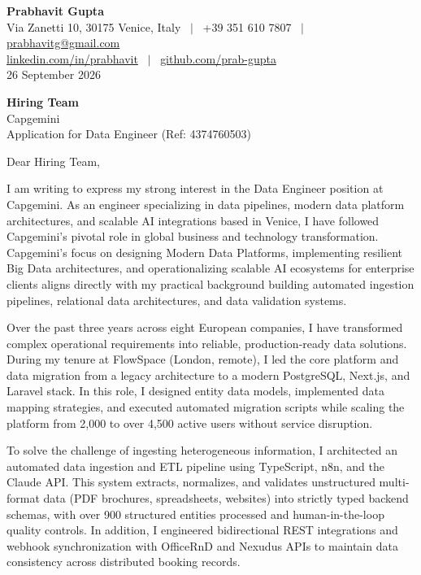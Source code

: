 \documentclass[11pt,a4paper]{article}
\begin{document}
\textbf{\large Prabhavit Gupta}\\
Via Zanetti 10, 30175 Venice, Italy ~$\vert$~ +39 351 610 7807 ~$\vert$~ \href{mailto:prabhavitg@gmail.com}{prabhavitg@gmail.com}\\
\href{https://www.linkedin.com/in/prabhavit/}{linkedin.com/in/prabhavit} ~$\vert$~ \href{https://github.com/prab-gupta}{github.com/prab-gupta}\\
26 September 2026

\textbf{Hiring Team}\\
Capgemini\\
Application for Data Engineer (Ref: 4374760503)

Dear Hiring Team,

I am writing to express my strong interest in the Data Engineer position at Capgemini. As an engineer specializing in data pipelines, modern data platform architectures, and scalable AI integrations based in Venice, I have followed Capgemini's pivotal role in global business and technology transformation. Capgemini's focus on designing Modern Data Platforms, implementing resilient Big Data architectures, and operationalizing scalable AI ecosystems for enterprise clients aligns directly with my practical background building automated ingestion pipelines, relational data architectures, and data validation systems.

Over the past three years across eight European companies, I have transformed complex operational requirements into reliable, production-ready data solutions. During my tenure at FlowSpace (London, remote), I led the core platform and data migration from a legacy architecture to a modern PostgreSQL, Next.js, and Laravel stack. In this role, I designed entity data models, implemented data mapping strategies, and executed automated migration scripts while scaling the platform from 2,000 to over 4,500 active users without service disruption.

To solve the challenge of ingesting heterogeneous information, I architected an automated data ingestion and ETL pipeline using TypeScript, n8n, and the Claude API. This system extracts, normalizes, and validates unstructured multi-format data (PDF brochures, spreadsheets, websites) into strictly typed backend schemas, with over 900 structured entities processed and human-in-the-loop quality controls. In addition, I engineered bidirectional REST integrations and webhook synchronization with OfficeRnD and Nexudus APIs to maintain data consistency across distributed booking records.
\end{document}
